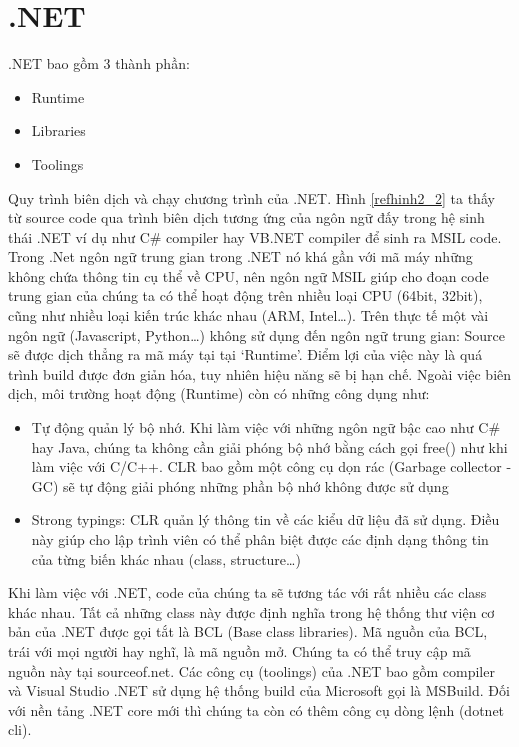 \section{.NET}
.NET bao gồm 3 thành phần:
\begin{itemize}
\item Runtime
\item Libraries
\item Toolings
\end{itemize}
\par
Quy trình biên dịch và chạy chương trình của .NET. Hình \ref{refhinh2_2} ta thấy từ source code qua trình biên dịch tương ứng của ngôn ngữ đấy trong hệ sinh thái .NET ví dụ như C\# compiler hay VB.NET compiler để sinh ra MSIL code. Trong .Net ngôn ngữ trung gian trong .NET nó khá gần với mã máy những không chứa thông tin cụ thể về CPU, nên ngôn ngữ MSIL giúp cho đoạn code trung gian của chúng ta có thể hoạt động trên nhiều loại CPU (64bit, 32bit), cũng như nhiều loại kiến trúc khác nhau (ARM, Intel…). Trên thực tế một vài ngôn ngữ (Javascript, Python…) không sử dụng đến ngôn ngữ trung gian: Source sẽ được dịch thẳng ra mã máy tại tại ‘Runtime’. Điểm lợi của việc này là quá trình build được đơn giản hóa, tuy nhiên hiệu năng sẽ bị hạn chế.
Ngoài việc biên dịch, môi trường hoạt động (Runtime) còn có những công dụng như:
\begin{itemize}
\item Tự động quản lý bộ nhớ. Khi làm việc với những ngôn ngữ bậc cao như C\# hay Java, chúng ta không cần  giải phóng bộ nhớ bằng cách gọi free() như khi làm việc với C/C++. CLR bao gồm một công cụ dọn rác (Garbage collector -GC) sẽ tự động giải phóng những phần bộ nhớ không được sử dụng
\item Strong typings: CLR quản lý thông tin về các kiểu dữ liệu đã sử dụng. Điều này giúp cho lập trình viên có thể phân biệt được các định dạng thông tin của từng biến khác nhau (class, structure…)
\end{itemize}
Khi làm việc với .NET, code của chúng ta sẽ tương tác với rất nhiều các class khác nhau. Tất cả những class này được định nghĩa trong hệ thống thư viện cơ bản của .NET được gọi tắt là BCL (Base class libraries). Mã nguồn của BCL, trái với mọi người hay nghĩ, là mã nguồn mở. Chúng ta có thể truy cập mã nguồn này tại sourceof.net. Các công cụ (toolings) của .NET bao gồm compiler và Visual Studio .NET sử dụng hệ thống build của Microsoft gọi là MSBuild. Đối với nền tảng .NET core mới thì chúng ta còn có thêm công cụ dòng lệnh (dotnet cli).
